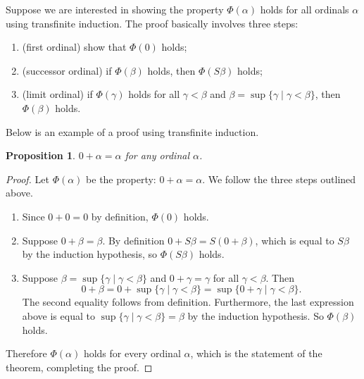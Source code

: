 \documentclass[12pt]{article}
\newtheorem{prop}{Proposition}
\begin{document}
Suppose we are interested in showing the property $\Phi(\alpha)$ holds for all ordinals $\alpha$ using transfinite induction.  The proof basically involves three steps:
\begin{enumerate}
\item (first ordinal) show that $\Phi(0)$ holds;
\item (successor ordinal) if $\Phi(\beta)$ holds, then $\Phi(S\beta)$ holds;
\item (limit ordinal) if $\Phi(\gamma)$ holds for all $\gamma<\beta$ and $\beta=\sup\lbrace \gamma\mid \gamma<\beta\rbrace$, then $\Phi(\beta)$ holds.
\end{enumerate}

Below is an example of a proof using transfinite induction.

\begin{prop} $0+\alpha=\alpha$ for any ordinal $\alpha$.  \end{prop}

\begin{proof}
Let $\Phi(\alpha)$ be the property: $0+\alpha=\alpha$.  We follow the three steps outlined above.
\begin{enumerate}
\item Since $0+0=0$ by definition, $\Phi(0)$ holds.
\item Suppose $0+\beta=\beta$. By definition $0+S\beta=S(0+\beta)$, which is equal to $S\beta$ by the induction hypothesis, so $\Phi(S\beta)$ holds.
\item Suppose $\beta=\sup\lbrace\gamma\mid \gamma<\beta\rbrace$ and $0+\gamma=\gamma$ for all $\gamma<\beta$.  Then $$0+\beta = 0+\sup\lbrace\gamma\mid \gamma<\beta\rbrace = \sup \lbrace 0+\gamma\mid \gamma<\beta\rbrace.$$  The second equality follows from definition.  Furthermore, the last expression above is equal to $\sup \lbrace \gamma\mid \gamma<\beta\rbrace =\beta$ by the induction hypothesis.  So $\Phi(\beta)$ holds.
\end{enumerate}
Therefore $\Phi(\alpha)$ holds for every ordinal $\alpha$, which is the statement of the theorem, completing the proof.
\end{proof}
\end{document}

